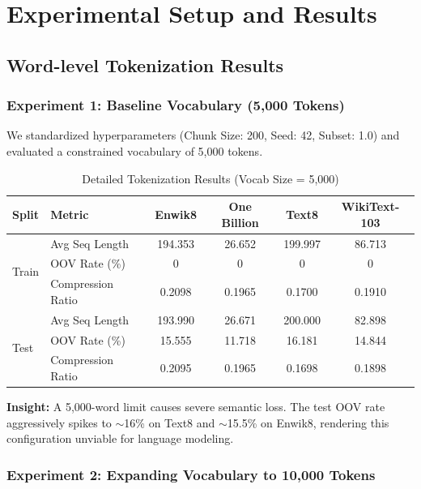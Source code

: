 \section{Experimental Setup and Results}
\subsection{Word-level Tokenization Results}

\subsubsection{Experiment 1: Baseline Vocabulary (5,000 Tokens)}
We standardized hyperparameters (Chunk Size: 200, Seed: 42, Subset: 1.0) and evaluated a constrained vocabulary of 5,000 tokens.

\begin{table}[H]
\centering
\caption{Detailed Tokenization Results (Vocab Size = 5,000)}
\renewcommand{\arraystretch}{1.1}
\begin{tabular}{|l|l|c|c|c|c|}
\hline
\textbf{Split} & \textbf{Metric} & \textbf{Enwik8} & \textbf{One Billion} & \textbf{Text8} & \textbf{WikiText-103} \\ \hline
\multirow{3}{*}{Train} 
 & Avg Seq Length & 194.353 & 26.652 & 199.997 & 86.713 \\ \cline{2-6}
 & OOV Rate (\%) & 0 & 0 & 0 & 0 \\ \cline{2-6}
 & Compression Ratio & 0.2098 & 0.1965 & 0.1700 & 0.1910 \\ \hline
\multirow{3}{*}{Test}  
 & Avg Seq Length & 193.990 & 26.671 & 200.000 & 82.898 \\ \cline{2-6}
 & OOV Rate (\%) & 15.555 & 11.718 & 16.181 & 14.844 \\ \cline{2-6}
 & Compression Ratio & 0.2095 & 0.1965 & 0.1698 & 0.1898 \\ \hline
\end{tabular}
\end{table}

\textbf{Insight:} A 5,000-word limit causes severe semantic loss. The test OOV rate aggressively spikes to $\sim$16\% on Text8 and $\sim$15.5\% on Enwik8, rendering this configuration unviable for language modeling.

\subsubsection{Experiment 2: Expanding Vocabulary to 10,000 Tokens}

